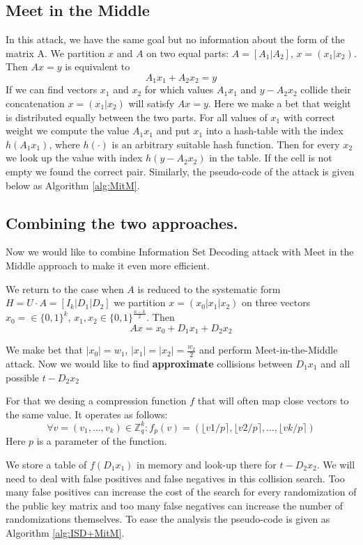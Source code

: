 \documentclass[12pt]{article}
\newcommand{\ZZ}{\mathbb{Z}}
\begin{document}
\subsection{Meet in the Middle}
In this attack, we have the same goal but no information about the form of the matrix A.
We partition $x$ and $A$ on two equal parts: $A = [A_1 | A_2]$, $x = (x_1 | x_2)$.
Then $Ax = y$ is equivalent to
\[
    A_1x_1 + A_2x_2 = y
\]
If we can find vectors $x_1$ and $x_2$ for which values $A_1x_1$ and $y - A_2x_2$ collide their concatenation $x = (x_1 |x_2)$ will satisfy $Ax = y$. Here we make a bet that weight is distributed equally between the two parts. For all values of $x_1$ with correct weight we compute the value $A_1x_1$ and put $x_1$ into a hash-table with the index $h(A_1x_1)$, where $h(\cdot)$ is an arbitrary suitable hash function. Then for every $x_2$ we look up the value with index $h(y - A_2x_2)$ in the table. If the cell is not empty we found the correct pair. Similarly, the pseudo-code of the attack is given below as Algorithm \ref{alg:MitM}.

\subsection{Combining the two approaches.}

Now we would like to combine Information Set Decoding attack with Meet in the Middle approach to make it even more efficient.

We return to the case when $A$ is reduced to the systematic form $H = U \cdot A = [I_{k}| D_1 | D_2]$ we partition $x = (x_0 |x_1 |x_2)$ on three vectors $x_0 = \in \{0,1\}^{k}$, $x_1,x_2 \in \{0,1\}^{\frac{n-k}{2}}$. Then
\[
  Ax = x_0 + D_1x_1 + D_2x_2
\]

We make bet that $|x_0| = w_1$, $|x_1| = |x_2| = \frac{w_2}{2}$ and perform Meet-in-the-Middle attack. Now we would like to find \textbf{approximate} collisions between $D_1x_1$ and all possible $t - D_2x_2$

For that we desing a compression function $f$ that will often map close vectors to the same value. It operates as follows:
\[
\forall v = (v_1, \dots , v_k)\in \ZZ_{q}^{k}: f_{p}(v) = (\lfloor v1/p \rceil, \lfloor v2/p \rceil, \dots, \lfloor vk/p \rceil)
\]
Here $p$ is a parameter of the function.

We store a table of $f(D_1x_1)$ in memory and look-up there for $t - D_2x_2$. We will need to deal with false positives and false negatives in this collision search. Too many false positives can increase the cost of the search for every randomization of the public key matrix and too many false negatives can increase the number of randomizations themselves. To ease the analysis the pseudo-code is given as Algorithm \ref{alg:ISD+MitM}.
\end{document}
